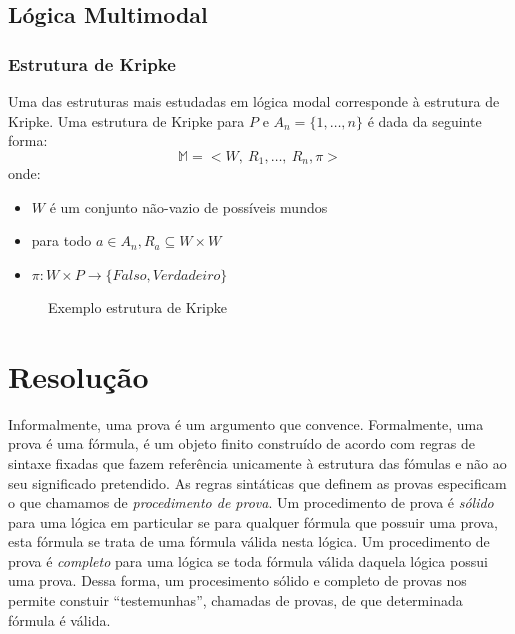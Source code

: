 \subsection{Lógica Multimodal}
\label{sub:lógica_multimodal}


\subsubsection{Estrutura de Kripke}

Uma das estruturas mais estudadas em lógica modal corresponde à estrutura de
Kripke. Uma estrutura de Kripke para $P$ e $A_n = \{1, \ldots, n\}$ é dada da seguinte forma:
\begin{equation}
\mathbb{M} = <W,\ R_1, \ldots,\ R_n, \pi>
\end{equation}
onde:
\begin{itemize}
    \item $W$ é um conjunto não-vazio de possíveis mundos
    \item para todo $a \in A_n, R_a \subseteq W \times W$
    \item $\pi: W \times P \longrightarrow \{Falso, Verdadeiro\}$
\end{itemize}


\begin{figure}
\begin{center}
\label{figure:mundos_relacao}
\caption{Exemplo estrutura de Kripke}
\end{center}
\end{figure}



\section{Resolução}
\label{sec:resolucao}
Informalmente, uma prova é um argumento que convence. Formalmente, uma prova é
uma fórmula, é um objeto finito construído de acordo com regras de sintaxe
fixadas que fazem referência unicamente à estrutura das fómulas e não ao seu
significado pretendido. As regras sintáticas que definem as provas especificam o
que chamamos de \textit{procedimento de prova}.
Um procedimento de prova é \textit{sólido} para uma lógica em particular se
para qualquer fórmula que possuir uma prova, esta fórmula se trata de uma
fórmula válida nesta lógica. Um procedimento de prova é \textit{completo} para
uma lógica se toda fórmula válida daquela lógica possui uma prova. Dessa forma,
um procesimento sólido e completo de provas nos permite constuir
``testemunhas'', chamadas de provas, de que determinada fórmula é válida.

